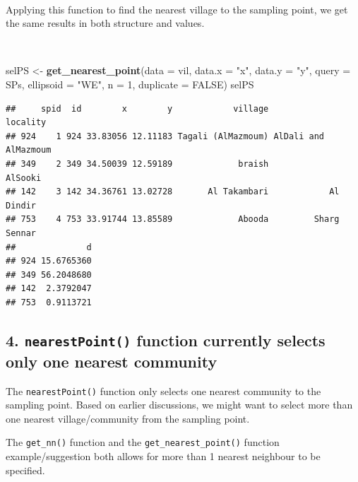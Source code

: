\documentclass[11pt,a4paper]{article}
\newenvironment{Shaded}{}{}
\newcommand{\KeywordTok}[1]{\textcolor[rgb]{0.00,0.44,0.13}{\textbf{#1}}}
\newcommand{\DataTypeTok}[1]{\textcolor[rgb]{0.56,0.13,0.00}{#1}}
\newcommand{\DecValTok}[1]{\textcolor[rgb]{0.25,0.63,0.44}{#1}}
\newcommand{\StringTok}[1]{\textcolor[rgb]{0.25,0.44,0.63}{#1}}
\newcommand{\OtherTok}[1]{\textcolor[rgb]{0.00,0.44,0.13}{#1}}
\newcommand{\NormalTok}[1]{#1}
\begin{document}
~

Applying this function to find the nearest village to the sampling
point, we get the same results in both structure and values.

~

\begin{Shaded}
\begin{Highlighting}[]
\NormalTok{selPS <-}\StringTok{ }\KeywordTok{get_nearest_point}\NormalTok{(}\DataTypeTok{data =}\NormalTok{ vil, }\DataTypeTok{data.x =} \StringTok{"x"}\NormalTok{, }\DataTypeTok{data.y =} \StringTok{"y"}\NormalTok{, }
                           \DataTypeTok{query =}\NormalTok{ SPs, }\DataTypeTok{ellipsoid =} \StringTok{"WE"}\NormalTok{,}
                           \DataTypeTok{n =} \DecValTok{1}\NormalTok{, }\DataTypeTok{duplicate =} \OtherTok{FALSE}\NormalTok{)}
\NormalTok{selPS}
\end{Highlighting}
\end{Shaded}

\begin{verbatim}
##     spid  id        x        y            village             locality
## 924    1 924 33.83056 12.11183 Tagali (AlMazmoum) AlDali and AlMazmoum
## 349    2 349 34.50039 12.59189             braish              AlSooki
## 142    3 142 34.36761 13.02728       Al Takambari            Al Dindir
## 753    4 753 33.91744 13.85589             Abooda         Sharg Sennar
##              d
## 924 15.6765360
## 349 56.2048680
## 142  2.3792047
## 753  0.9113721
\end{verbatim}

\newpage

\hypertarget{nearestpoint-function-currently-selects-only-one-nearest-community}{%
\subsection{\texorpdfstring{4. \texttt{nearestPoint()} function
currently selects only one nearest
community}{4. nearestPoint() function currently selects only one nearest community}}\label{nearestpoint-function-currently-selects-only-one-nearest-community}}

The \texttt{nearestPoint()} function only selects one nearest community
to the sampling point. Based on earlier discussions, we might want to
select more than one nearest village/community from the sampling point.

The \texttt{get\_nn()} function and the \texttt{get\_nearest\_point()}
function example/suggestion both allows for more than 1 nearest
neighbour to be specified.
\end{document}
